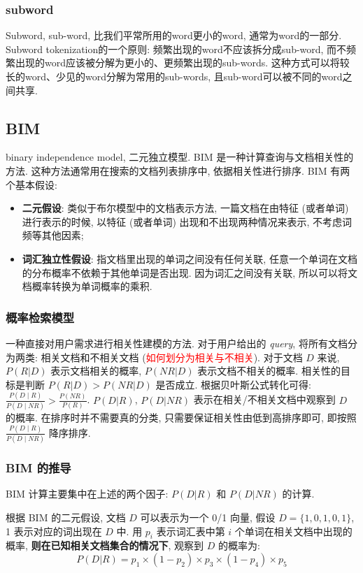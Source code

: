 \subsubsection{subword}
Subword, sub-word, 比我们平常所用的word更小的word, 通常为word的一部分. Subword tokenization的一个原则: 频繁出现的word不应该拆分成sub-word, 而不频繁出现的word应该被分解为更小的、更频繁出现的sub-words. 这种方式可以将较长的word、少见的word分解为常用的sub-words, 且sub-word可以被不同的word之间共享. 


\subsection{BIM}
binary independence model, 二元独立模型. BIM 是一种计算查询与文档相关性的方法. 这种方法通常用在搜索的文档列表排序中, 依据相关性进行排序. BIM 有两个基本假设: 
\begin{itemize}
	\item \textbf{二元假设}: 类似于布尔模型中的文档表示方法, 一篇文档在由特征 (或者单词) 进行表示的时候, 以特征 (或者单词) 出现和不出现两种情况来表示, 不考虑词频等其他因素;
	
	\item \textbf{词汇独立性假设}: 指文档里出现的单词之间没有任何关联, 任意一个单词在文档的分布概率不依赖于其他单词是否出现. 因为词汇之间没有关联, 所以可以将文档概率转换为单词概率的乘积.
\end{itemize} 

\subsubsection{概率检索模型}
一种直接对用户需求进行相关性建模的方法. 对于用户给出的 \textit{query}, 将所有文档分为两类: 相关文档和不相关文档 (\textcolor{red}{如何划分为相关与不相关}). 对于文档 $D$ 来说, $P(R|D)$ 表示文档相关的概率, $P(NR|D)$ 表示文档不相关的概率. 相关性的目标是判断 $P(R|D) > P(NR|D)$ 是否成立. 根据贝叶斯公式转化可得: $\frac{P(D \mid R)}{P(D \mid N R)}>\frac{P(N R)}{P(R)}$. $P(D|R)$, $P(D|NR)$ 表示在相关/不相关文档中观察到 $D$ 的概率. 在排序时并不需要真的分类, 只需要保证相关性由低到高排序即可, 即按照 $\frac{P(D \mid R)}{P(D \mid N R)}$ 降序排序.

\subsubsection{BIM 的推导}
BIM 计算主要集中在上述的两个因子: $P(D|R)$ 和 $P(D|NR)$ 的计算.

根据 BIM 的二元假设, 文档 $D$ 可以表示为一个 0/1 向量, 假设 $D = \{1, 0, 1, 0, 1\}$, 1 表示对应的词出现在 $D$ 中. 用 $p_i$ 表示词汇表中第 $i$ 个单词在相关文档中出现的概率, \textbf{则在已知相关文档集合的情况下}, 观察到 $D$ 的概率为:
$$
P(D|R) = p_1 \times (1-p_2) \times p_3 \times (1-p_4) \times p_5
$$


